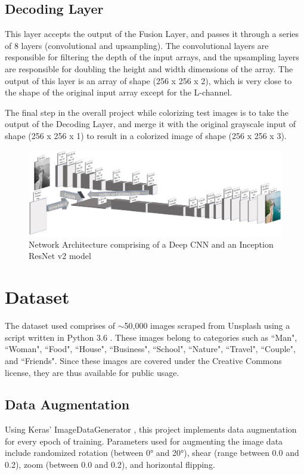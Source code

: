 \documentclass[10pt,twocolumn,letterpaper]{article}
\begin{document}
\subsection{Decoding Layer}
This layer accepts the output of the Fusion Layer, and passes it through a series of 8 layers (convolutional and upsampling). The convolutional layers are responsible for filtering the depth of the input arrays, and the upsampling layers are responsible for doubling the height and width dimensions of the array. The output of this layer is an array of shape (256 x 256 x 2), which is very close to the shape of the original input array except for the L-channel.

The final step in the overall project while colorizing test images is to take the output of the Decoding Layer, and merge it with the original grayscale input of shape (256 x 256 x 1) to result in a colorized image of shape (256 x 256 x 3).

\begin{figure}
\includegraphics[width=\textwidth]{Architecture}
\caption{Network Architecture comprising of a Deep CNN and an Inception ResNet v2 model}
\centering
\end{figure}

\section{Dataset}
The dataset used comprises of $\sim$50,000 images scraped from Unsplash \cite{Unsplash} using a script written in Python 3.6 \cite{Python}. These images belong to categories such as ``Man", ``Woman", ``Food", ``House", ``Business", ``School", ``Nature", ``Travel", ``Couple", and ``Friends". Since these images are covered under the Creative Commons license, they are thus available for public usage.

\subsection{Data Augmentation}
Using Keras' ImageDataGenerator \cite{Keras}, this project implements data augmentation for every epoch of training. Parameters used for augmenting the image data include randomized rotation (between 0° and 20°), shear (range between 0.0 and 0.2), zoom (between 0.0 and 0.2), and horizontal flipping.
\end{document}

